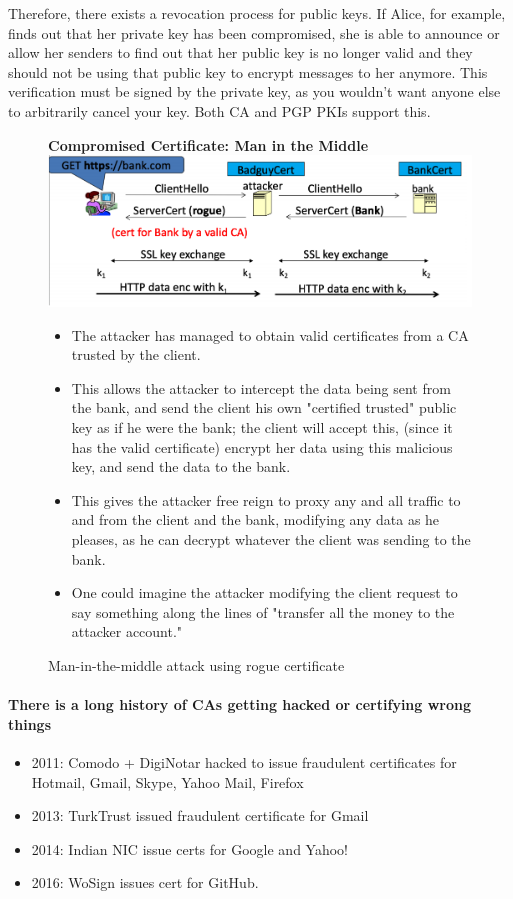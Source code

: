 \documentclass[11pt]{article} %
\begin{document}
{\bigskip
Therefore, there exists a revocation process for public keys. If Alice, for example, finds out that her private key has been compromised, she is able to announce or allow her senders to find out that her public key is no longer valid and they should not be using that public key to encrypt messages to her anymore. This verification must be signed by the private key, as you wouldn't want anyone else to arbitrarily cancel your key. Both CA and PGP PKIs support this. 
\newpage
\begin{figure}
    \centering
    \textbf{Compromised Certificate: Man in the Middle}
    \includegraphics[scale=.4]{./cert3.png}
    \caption{Man-in-the-middle attack using rogue certificate}
    \begin{itemize}
      \item The attacker has managed to obtain valid certificates from a CA trusted by the client.
      \item This allows the attacker to intercept the data being sent from the bank, and send the client his own "certified trusted" public key as if he were the bank; the client will accept this, (since it has the valid certificate) encrypt her data using this malicious key, and send the data to the bank.
      \item This gives the attacker free reign to proxy any and all traffic to and from the client and the bank, modifying any data as he pleases, as he can decrypt whatever the client was sending to the bank.
      \item One could imagine the attacker modifying the client request to say something along the lines of "transfer all the money to the attacker account." 
    \end{itemize}
\end{figure}

\paragraph{There is a long history of CAs getting hacked or certifying wrong things}
 \begin{itemize}
    \item 2011: Comodo + DigiNotar hacked to issue fraudulent certificates for Hotmail, Gmail, Skype, Yahoo Mail, Firefox
    \item 2013: TurkTrust issued fraudulent certificate for Gmail
    \item 2014: Indian NIC issue certs for Google and Yahoo!
    \item 2016: WoSign issues cert for GitHub.
\end{itemize}
}
\end{document}
